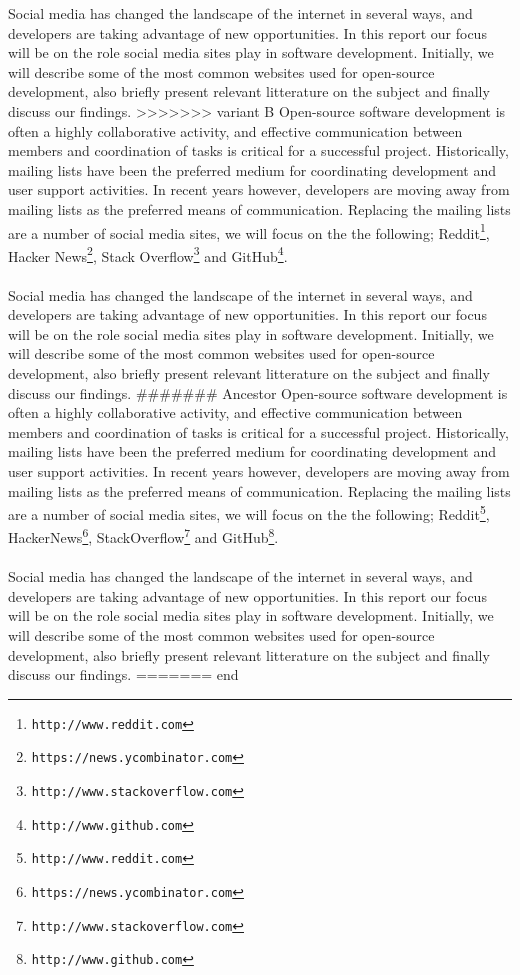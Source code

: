 \documentclass[a4paper,11pt]{article} %
\begin{document}
Social media has changed the landscape of the internet in several ways, and
developers are taking advantage of new opportunities. In this report our
focus will be on the role social media sites play in software
development. Initially, we will describe some of the most common websites
used for open-source development, also briefly present relevant litterature
on the subject and finally discuss our findings.
>>>>>>> variant B
Open-source software development is often a highly collaborative activity, and effective communication 
between members and coordination of tasks is critical for a successful project. 
Historically, mailing lists have been the preferred medium for coordinating development
and user support activities\cite{Vasilescu14StackOverflow}. In recent years however, 
developers are moving away from mailing lists as the preferred means of communication.
Replacing the mailing lists are a number of social media sites, we will focus on the the following;
Reddit\footnote{\texttt{http://www.reddit.com}}, Hacker News\footnote{\texttt{https://news.ycombinator.com}},
Stack Overflow\footnote{\texttt{http://www.stackoverflow.com}} and GitHub\footnote{\texttt{http://www.github.com}}.
\\\\Social media has changed the landscape of the internet in several ways, and developers are taking advantage of new opportunities. In this report our focus will be on the role social
media sites play in software development. Initially, we will describe some of the most common
websites used for open-source development, also briefly present relevant 
litterature on the subject and finally discuss our findings.
####### Ancestor
Open-source software development is often a highly collaborative activity, and effective communication 
between members and coordination of tasks is critical for a successful project. 
Historically, mailing lists have been the preferred medium for coordinating development
and user support activities\cite{Vasilescu14StackOverflow}. In recent years however, 
developers are moving away from mailing lists as the preferred means of communication.
Replacing the mailing lists are a number of social media sites, we will focus on the the following;
Reddit\footnote{\texttt{http://www.reddit.com}}, HackerNews\footnote{\texttt{https://news.ycombinator.com}},
StackOverflow\footnote{\texttt{http://www.stackoverflow.com}} and GitHub\footnote{\texttt{http://www.github.com}}.
\\\\Social media has changed the landscape of the internet in several ways, and developers are taking advantage of new opportunities. In this report our focus will be on the role social
media sites play in software development. Initially, we will describe some of the most common
websites used for open-source development, also briefly present relevant 
litterature on the subject and finally discuss our findings.
======= end
\end{document}
